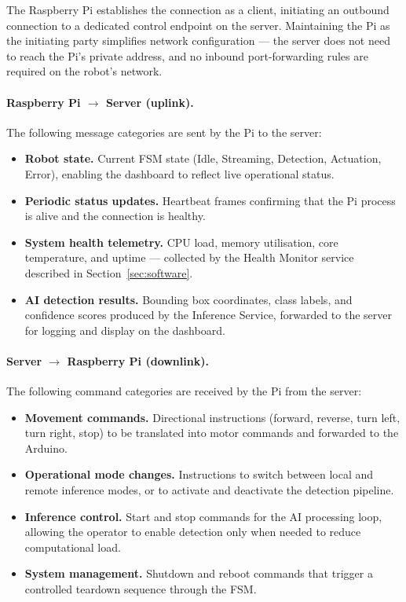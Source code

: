The Raspberry Pi establishes the connection as a client, initiating an
outbound connection to a dedicated control endpoint on the server.
Maintaining the Pi as the initiating party simplifies network
configuration — the server does not need to reach the Pi's private
address, and no inbound port-forwarding rules are required on the
robot's network.
 
\paragraph{Raspberry Pi $\to$ Server (uplink).}
The following message categories are sent by the Pi to the server:
 
\begin{itemize}
    \item \textbf{Robot state.} Current FSM state (Idle, Streaming,
          Detection, Actuation, Error), enabling the dashboard to
          reflect live operational status.
    \item \textbf{Periodic status updates.} Heartbeat frames confirming
          that the Pi process is alive and the connection is healthy.
    \item \textbf{System health telemetry.} CPU load, memory
          utilisation, core temperature, and uptime — collected by the
          Health Monitor service described in
          Section~\ref{sec:software}.
    \item \textbf{AI detection results.} Bounding box coordinates,
          class labels, and confidence scores produced by the
          Inference Service, forwarded to the server for logging and
          display on the dashboard.
\end{itemize}
 
\paragraph{Server $\to$ Raspberry Pi (downlink).}
The following command categories are received by the Pi from the
server:
 
\begin{itemize}
    \item \textbf{Movement commands.} Directional instructions
          (forward, reverse, turn left, turn right, stop) to be
          translated into motor commands and forwarded to the Arduino.
    \item \textbf{Operational mode changes.} Instructions to switch
          between local and remote inference modes, or to activate
          and deactivate the detection pipeline.
    \item \textbf{Inference control.} Start and stop commands for
          the AI processing loop, allowing the operator to enable
          detection only when needed to reduce computational load.
    \item \textbf{System management.} Shutdown and reboot commands
          that trigger a controlled teardown sequence through the FSM.
\end{itemize}
 
